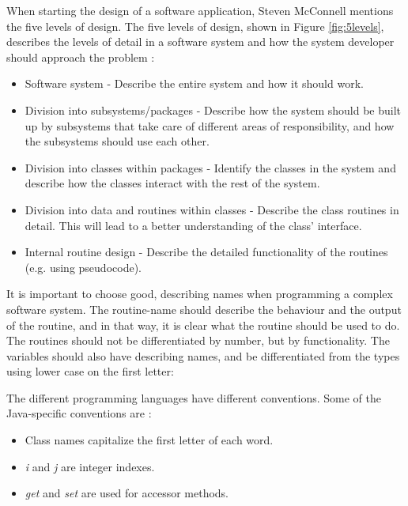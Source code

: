 \label{sec:levdes}
When starting the design of a software application, Steven McConnell mentions the five levels of design. The five levels of design, shown in Figure \ref{fig:5levels}, describes the levels of detail in a software system and how the system developer should approach the problem \cite{stevemcconnell2004}:
\begin{itemize}
    \item Software system - Describe the entire system and how it should work.
    \item Division into subsystems/packages - Describe how the system should be built up by subsystems that take care of different areas of responsibility, and how the subsystems should use each other.
    \item Division into classes within packages - Identify the classes in the system and describe how the classes interact with the rest of the system.
    \item Division into data and routines within classes - Describe the class routines in detail. This will lead to a better understanding of the class' interface.
    \item Internal routine design - Describe the detailed functionality of the routines (e.g. using pseudocode).
\end{itemize}

\label{sec:nameconv}
It is important to choose good, describing names when programming a complex software system. The routine-name should describe the behaviour and the output of the routine, and in that way, it is clear what the routine should be used to do. The routines should not be differentiated by number, but by functionality. The variables should also have describing names, and be differentiated from the types using lower case on the first letter: 

The different programming languages have different conventions. Some of the Java-specific conventions are \cite{stevemcconnell2004}:
\begin{itemize}
    \item Class names capitalize the first letter of each word.
    \item \textit{i} and \textit{j} are integer indexes.
    \item \textit{get} and \textit{set} are used for accessor methods.
\end{itemize}
